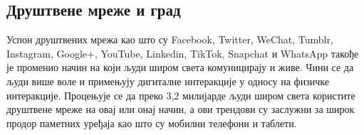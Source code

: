 \documentclass{article}
\begin{document}
\vspace{200}
\begin{multicols}{3}

\noindent
{}

\section*{Друштвене мреже и град}
\noindent Успон друштвених мрежа као што су Facebook, Twitter, WeChat, Tumblr, Instagram, Google+, YouTube, Linkedin, TikTok, Snapchat и WhatsApp такође је променио начин на који људи широм света комуницирају и живе. Чини се да људи више воле и примењују дигиталне интеракције у односу на физичке интеракције. 
Процењује се да преко 3,2 милијарде људи широм света користите друштвене мреже на овај или онај начин, а ови трендови су заслужни за широк продор паметних уређаја као што су мобилни телефони и таблети.


\end{multicols}
\end{document}

